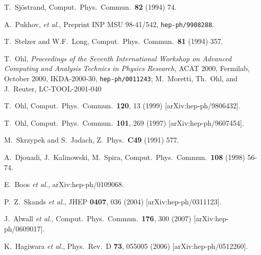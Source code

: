 \documentclass[12pt]{book}
\begin{document}
\begin{thebibliography}{19}

  T.~Sj\"ostrand,
  Comput.\ Phys.\ Commun.\ \textbf{82} (1994) 74.

  A.~Pukhov, \emph{et al.},
  Preprint INP MSU 98-41/542, \texttt{hep-ph/9908288}.

  T.~Stelzer and W.F.~Long,
  Comput.\ Phys.\ Commun.\ \textbf{81} (1994) 357.

  T.~Ohl,
  \emph{Proceedings of the Seventh International Workshop on
  Advanced Computing and Analysis Technics in Physics Research}, 
  ACAT 2000, Fermilab, October 2000,
  IKDA-2000-30, \texttt{hep-ph/0011243};
  M.~Moretti, Th.~Ohl, and J.~Reuter,
  LC-TOOL-2001-040

  T.~Ohl,
  Comput.\ Phys.\ Commun.\  {\bf 120}, 13 (1999)
  [arXiv:hep-ph/9806432].

  T.~Ohl,
  Comput.\ Phys.\ Commun.\  {\bf 101}, 269 (1997)
  [arXiv:hep-ph/9607454].

  M.~Skrzypek and S.~Jadach,
  Z.\ Phys.\ \textbf{C49} (1991) 577.	

  A.~Djouadi, J.~Kalinowski, M.~Spira,
  Comput.\ Phys.\ Commun.\ \textbf{108} (1998) 56-74.

  E.~Boos {\it et al.},
  arXiv:hep-ph/0109068.

  P.~Z.~Skands {\it et al.},
  JHEP {\bf 0407}, 036 (2004)
  [arXiv:hep-ph/0311123].

  J.~Alwall {\it et al.},
  Comput.\ Phys.\ Commun.\  {\bf 176}, 300 (2007)
  [arXiv:hep-ph/0609017].

  K.~Hagiwara {\it et al.},
  Phys.\ Rev.\  D {\bf 73}, 055005 (2006)
  [arXiv:hep-ph/0512260].


\end{thebibliography}
\end{document}
